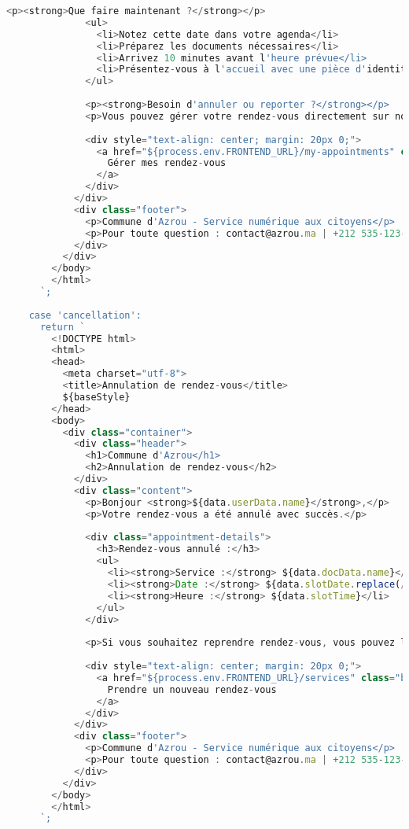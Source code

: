 \begin{lstlisting}[language=JavaScript, caption=emailService.js - Service complet de notifications]
              <p><strong>Que faire maintenant ?</strong></p>
              <ul>
                <li>Notez cette date dans votre agenda</li>
                <li>Préparez les documents nécessaires</li>
                <li>Arrivez 10 minutes avant l'heure prévue</li>
                <li>Présentez-vous à l'accueil avec une pièce d'identité</li>
              </ul>
              
              <p><strong>Besoin d'annuler ou reporter ?</strong></p>
              <p>Vous pouvez gérer votre rendez-vous directement sur notre site web ou nous contacter.</p>
              
              <div style="text-align: center; margin: 20px 0;">
                <a href="${process.env.FRONTEND_URL}/my-appointments" class="btn">
                  Gérer mes rendez-vous
                </a>
              </div>
            </div>
            <div class="footer">
              <p>Commune d'Azrou - Service numérique aux citoyens</p>
              <p>Pour toute question : contact@azrou.ma | +212 535-123-000</p>
            </div>
          </div>
        </body>
        </html>
      `;
      
    case 'cancellation':
      return `
        <!DOCTYPE html>
        <html>
        <head>
          <meta charset="utf-8">
          <title>Annulation de rendez-vous</title>
          ${baseStyle}
        </head>
        <body>
          <div class="container">
            <div class="header">
              <h1>Commune d'Azrou</h1>
              <h2>Annulation de rendez-vous</h2>
            </div>
            <div class="content">
              <p>Bonjour <strong>${data.userData.name}</strong>,</p>
              <p>Votre rendez-vous a été annulé avec succès.</p>
              
              <div class="appointment-details">
                <h3>Rendez-vous annulé :</h3>
                <ul>
                  <li><strong>Service :</strong> ${data.docData.name}</li>
                  <li><strong>Date :</strong> ${data.slotDate.replace(/_/g, '/')}</li>
                  <li><strong>Heure :</strong> ${data.slotTime}</li>
                </ul>
              </div>
              
              <p>Si vous souhaitez reprendre rendez-vous, vous pouvez le faire à tout moment sur notre site web.</p>
              
              <div style="text-align: center; margin: 20px 0;">
                <a href="${process.env.FRONTEND_URL}/services" class="btn">
                  Prendre un nouveau rendez-vous
                </a>
              </div>
            </div>
            <div class="footer">
              <p>Commune d'Azrou - Service numérique aux citoyens</p>
              <p>Pour toute question : contact@azrou.ma | +212 535-123-000</p>
            </div>
          </div>
        </body>
        </html>
      `;
      

\end{lstlisting}
